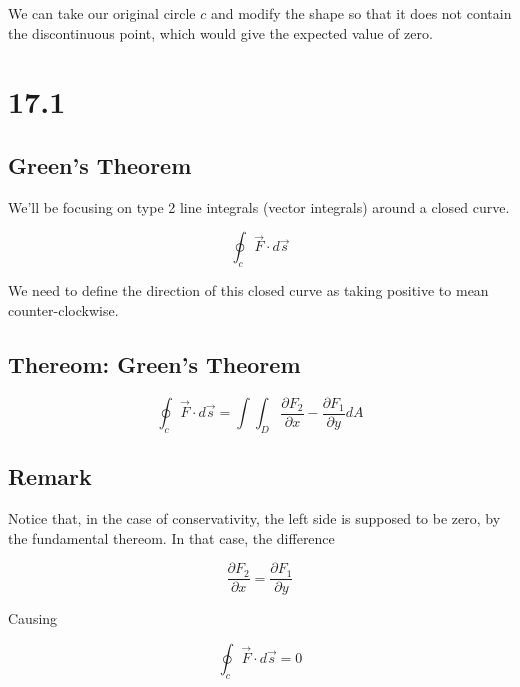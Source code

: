 \documentclass{article}
\begin{document}
We can take our original circle $c$ and modify the shape so that it does not contain the discontinuous point, which would give the expected value of zero.


\hrulefill

\section*{17.1}
\subsection*{Green's Theorem}

We'll be focusing on type 2 line integrals (vector integrals) around a closed curve.

\[
\oint_c \vec{F}\cdot d\vec{s}
\]

We need to define the direction of this closed curve as taking positive to mean counter-clockwise.


\subsection*{Thereom: Green's Theorem}

\[
\oint_c \vec{F}\cdot d\vec{s} = \int \int_D \dfrac{\partial F_2}{\partial x} - \dfrac{\partial F_1}{\partial y} dA
\]

\subsection*{Remark}

Notice that, in the case of conservativity, the left side is supposed to be zero, by the fundamental thereom. In that case, the difference

\[
\dfrac{\partial F_2}{\partial x} = \dfrac{\partial F_1}{\partial y}
\]

Causing

\[
\oint_c \vec{F}\cdot d\vec{s} = 0
\]
\end{document}
